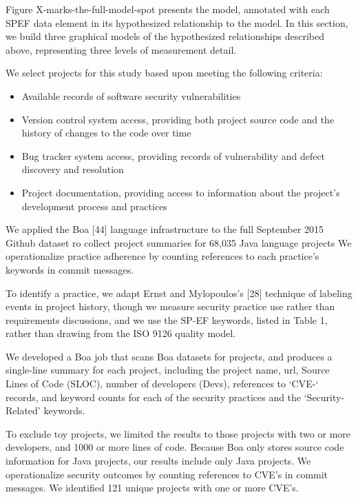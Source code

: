 Figure X-marks-the-full-model-spot presents the model, annotated with each SPEF data element in its hypothesized relationship to the model. 
In this section, we build three graphical models of the hypothesized relationships described above, representing three levels of measurement detail.




We select projects for this study based upon meeting the following criteria:
\begin{itemize}
	
	\item Available records of software security vulnerabilities
	\item Version control system access, providing both project source code and the history of changes to the code over time
	\item Bug tracker system access, providing records of vulnerability and defect discovery and resolution
	\item Project documentation, providing access to information about the project’s development process and practices
\end{itemize}


We applied the Boa [44] language infrastructure to the full September 2015 Github dataset ro collect project summaries for 68,035 Java language projects We operationalize practice adherence by counting references to each practice’s keywords in commit messages. 

To identify a practice, we adapt Ernst and Mylopoulos’s [28] technique of labeling events in project history, though we measure security practice use rather than requirements discussions, and we use the SP-EF keywords, listed in Table 1, rather than drawing from the ISO 9126 quality model. 

We developed a Boa job  that scans Boa datasets for projects, and produces a single-line summary for each project, including the project name, url, Source Lines of Code (SLOC), number of developers (Devs), references to ‘CVE-‘ records, and keyword counts for each of the security practices and the ‘Security-Related’ keywords.  

To exclude toy projects, we limited the results to those projects with two or more developers, and 1000 or more lines of code.  Because Boa only stores source code information for Java projects, our results include only Java projects. We operationalize security outcomes by counting references to CVE’s in commit messages.  We identified 121 unique projects with one or more CVE’s. 

